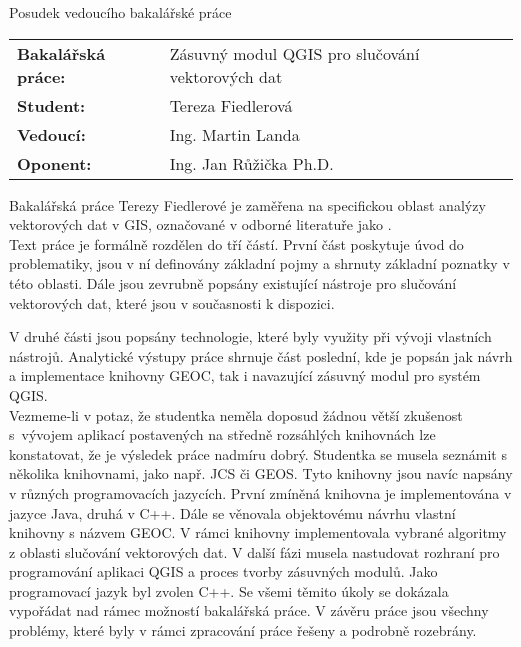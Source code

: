 \documentclass[czech,11pt,a4paper]{article}
\begin{document}
\begin{center}
  {\Large Posudek vedoucího bakalářské práce}
\end{center}

\vspace{.5cm}

\noindent \begin{tabular}{lp{}}
  {\bf Bakalářská práce:} &
  Zásuvný modul QGIS pro slučování vektorových dat \\
  {\bf Student:} & Tereza Fiedlerová \\
  {\bf Vedoucí:} & Ing. Martin Landa \\
  {\bf Oponent:} & Ing. Jan Růžička Ph.D. \\
\end{tabular}

\vspace{1cm}

Bakalářská práce Terezy Fiedlerové je zaměřena na specifickou oblast
analýzy vektorových dat v GIS, označované v odborné literatuře jako
.
\\

Text práce je formálně rozdělen do tří částí. První část poskytuje
úvod do problematiky, jsou v ní definovány základní pojmy a shrnuty
základní poznatky v této oblasti. Dále jsou zevrubně popsány
existující nástroje pro slučování vektorových dat, které jsou v
současnosti k dispozici.

V druhé části jsou popsány technologie, které byly využity při vývoji
vlastních nástrojů. Analytické výstupy práce shrnuje část poslední,
kde je popsán jak návrh a implementace knihovny GEOC, tak i navazující
zásuvný modul pro systém QGIS.
\\

Vezmeme-li v potaz, že studentka neměla doposud žádnou větší zkušenost
s~vývojem aplikací postavených na středně rozsáhlých knihovnách lze
konstatovat, že je výsledek práce nadmíru dobrý. Studentka se musela
seznámit s několika knihovnami, jako např. JCS či GEOS. Tyto knihovny
jsou navíc napsány v různých programovacích jazycích. První zmíněná
knihovna je implementována v jazyce Java, druhá v C++. Dále se
věnovala objektovému návrhu vlastní knihovny s názvem GEOC. V rámci
knihovny implementovala vybrané algo\-ritmy z oblasti slučování
vektorových dat. V další fázi musela nastudovat rozhraní pro
programování aplikaci QGIS a proces tvorby zásuvných modulů. Jako
programovací jazyk byl zvolen C++. Se všemi těmito úkoly se dokázala
vypořádat nad rámec možností bakalářská práce. V závěru práce jsou
všechny problémy, které byly v rámci zpracování práce řešeny a podrobně
rozebrány.
\\
\end{document}

